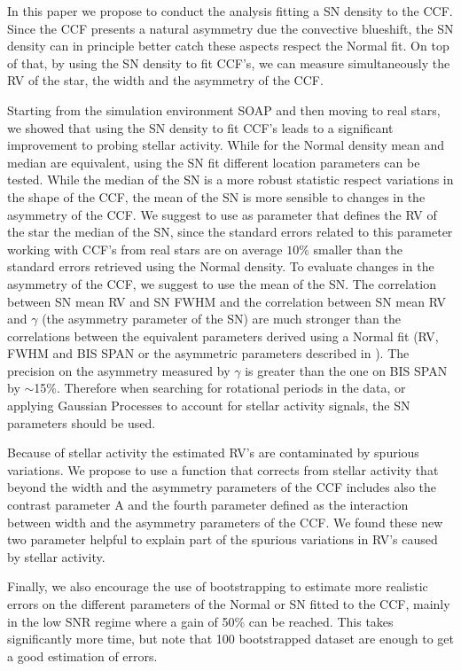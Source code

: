 \documentclass[11pt, oneside]{article}
\begin{document}
In this paper we propose to conduct the analysis fitting a SN density to the CCF. Since the CCF presents a natural asymmetry due the convective blueshift, the SN density can in principle better catch these aspects respect the Normal fit. On top of that, by using the SN density to fit CCF's, we can measure simultaneously the RV of the star, the width and the asymmetry of the CCF.

Starting from the simulation environment SOAP and then moving to real stars, we showed that using the SN density to fit CCF's leads to a significant improvement to probing stellar activity. While for the Normal density mean and median are equivalent, using the SN fit different location parameters can be tested. While the median of the SN is a more robust statistic respect variations in the shape of the CCF, the mean of the SN is more sensible to changes in the asymmetry of the CCF. We suggest to use as parameter that defines the RV of the star the median of the SN, since the standard errors related to this parameter working with CCF's from real stars are on average $10\%$ smaller than the standard errors retrieved using the Normal density. To evaluate changes in the asymmetry of the CCF, we suggest to use the mean of the SN. The correlation between SN mean RV and SN FWHM and the correlation between SN mean RV and $\gamma$ (the asymmetry parameter of the SN) are much stronger than the correlations between the equivalent parameters derived using a Normal fit (RV, FWHM and BIS SPAN or the asymmetric parameters described in \citet{Figueira-2013}). The precision on the asymmetry measured by $\gamma$ is greater than the one on BIS SPAN by $\sim$15\%. Therefore when searching for rotational periods in the data, or applying Gaussian Processes to account for stellar activity signals, the SN parameters should be used.

Because of stellar activity the estimated RV's are contaminated by spurious variations. We propose to use a function that corrects from stellar activity that beyond the width and the asymmetry parameters of the CCF includes also the contrast parameter A and the fourth parameter defined as the interaction between width and the asymmetry parameters of the CCF. We found these new two parameter helpful to explain part of the spurious variations in RV's caused by stellar activity.

Finally, we also encourage the use of bootstrapping to estimate more realistic errors on the different parameters of the Normal or SN fitted to the CCF, mainly in the low SNR regime where a gain of 50\% can be reached. This takes significantly more time, but note that 100 bootstrapped dataset are enough to get a good estimation of errors.
\end{document}
